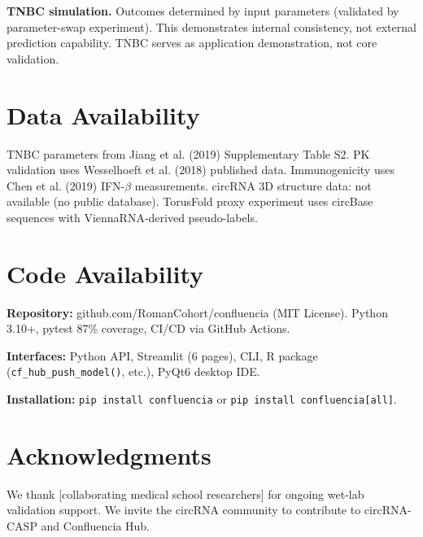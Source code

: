 \documentclass[12pt,a4paper]{article}
\begin{document}
\textbf{TNBC simulation.} Outcomes determined by input parameters (validated by parameter-swap experiment). This demonstrates internal consistency, not external prediction capability. TNBC serves as application demonstration, not core validation.

\section{Data Availability}

TNBC parameters from Jiang et al. (2019) Supplementary Table S2. PK validation uses Wesselhoeft et al. (2018) published data. Immunogenicity uses Chen et al. (2019) IFN-$\beta$ measurements. circRNA 3D structure data: not available (no public database). TorusFold proxy experiment uses circBase sequences with ViennaRNA-derived pseudo-labels.

\section{Code Availability}

\textbf{Repository:} github.com/RomanCohort/confluencia (MIT License). Python 3.10+, pytest 87\% coverage, CI/CD via GitHub Actions.

\textbf{Interfaces:} Python API, Streamlit (6 pages), CLI, R package (\texttt{cf\_hub\_push\_model()}, etc.), PyQt6 desktop IDE.

\textbf{Installation:} \texttt{pip install confluencia} or \texttt{pip install confluencia[all]}.

\section{Acknowledgments}

We thank [collaborating medical school researchers] for ongoing wet-lab validation support. We invite the circRNA community to contribute to circRNA-CASP and Confluencia Hub.
\end{document}

